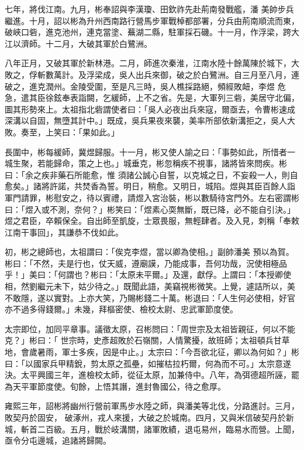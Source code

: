 \begin{pinyinscope}
 七年，將伐江南。九月，彬奉詔與李漢瓊、田欽祚先赴荊南發戰艦，潘
 美帥步兵繼進。十月，詔以彬為升州西南路行營馬步軍戰棹都部署，分兵由荊南順流而東，破峽口砦，進克池州，連克當塗、蕪湖二縣，駐軍採石磯。十一月，作浮梁，跨大江以濟師。十二月，大破其軍於白鷺洲。



 八年正月，又破其軍於新林港。二月，師進次秦淮，江南水陸十餘萬陳於城下，大敗之，俘斬數萬計。及浮梁成，吳人出兵來御，破之於白鷺洲。自三月至八月，連破之，進克潤州。金陵受圍，至是凡三時，吳人樵採路絕，頻經敗衄，李煜
 危急，遣其臣徐鉉奉表詣闕，乞緩師，上不之省。先是，大軍列三砦，美居守北偏，圖其形勢來上。太祖指北砦謂使者曰：「吳人必夜出兵來寇，爾亟去，令曹彬速成深溝以自固，無墮其計中。」既成，吳兵果夜來襲，美率所部依新溝拒之，吳人大敗。奏至，上笑曰：「果如此。」



 長圍中，彬每緩師，冀煜歸服。十一月，彬又使人諭之曰：「事勢如此，所惜者一城生聚，若能歸命，策之上也。」城垂克，彬忽稱疾不視事，諸將皆來問疾。彬曰：「余之疾非藥石所能愈，惟
 須諸公誠心自誓，以克城之日，不妄殺一人，則自愈矣。」諸將許諾，共焚香為誓。明日，稍愈。又明日，城陷。煜與其臣百餘人詣軍門請罪，彬慰安之，待以賓禮，請煜入宮治裝，彬以數騎待宮門外。左右密謂彬曰：「煜入或不測，奈何？」彬笑曰：「煜素心耎無斷，既已降，必不能自引決。」煜之君臣，卒賴保全。自出師至凱旋，士眾畏服，無輕肆者。及入見，刺稱「奉敕江南干事回」，其謙恭不伐如此。



 初，彬之總師也，太祖謂曰：「俟克李煜，當以卿為使相。」副帥潘美
 預以為賀。彬曰：「不然，夫是行也，仗天威，遵廟謨，乃能成事，吾何功哉，況使相極品乎！」美曰：「何謂也？彬曰：「太原未平爾。」及還，獻俘。上謂曰：「本授卿使相，然劉繼元未下，姑少待之。」既聞此語，美竊視彬微笑。上覺，遽詰所以，美不敢隱，遂以實對。上亦大笑，乃賜彬錢二十萬。彬退曰：「人生何必使相，好官亦不過多得錢爾。」未幾，拜樞密使、檢校太尉、忠武軍節度使。



 太宗即位，加同平章事。議徵太原，召彬問曰：「周世宗及太祖皆親征，何以不能克？」彬曰：「
 世宗時，史彥超敗於石嶺關，人情驚擾，故班師；太祖頓兵甘草地，會歲暑雨，軍士多疾，因是中止。」太宗曰：「今吾欲北征，卿以為何如？」彬曰：「以國家兵甲精銳，剪太原之孤壘，如摧枯拉朽爾，何為而不可。」太宗意遂決。太平興國三年，進檢校太師，從征太原，加兼侍中。八年，為弭德超所誣，罷為天平軍節度使。旬餘，上悟其譖，進封魯國公，待之愈厚。



 雍熙三年，詔彬將幽州行營前軍馬步水陸之師，與潘美等北伐，分路進討。三月，敗契丹於固安，
 破涿州，戎人來援，大破之於城南。四月，又與米信破契丹於新城，斬首二百級。五月，戰於岐溝關，諸軍敗績，退屯易州，臨易水而營。上聞，亟令分屯邊城，追諸將歸闕。




\end{pinyinscope}
